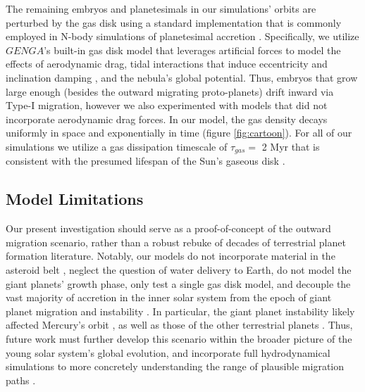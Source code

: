 \documentclass[trackchanges,twocolumn]{aastex}
\begin{document}
The remaining embryos and planetesimals in our simulations' orbits are perturbed by the gas disk using a standard implementation \citep{morishma10} that is commonly employed in N-body simulations of planetesimal accretion \citep[e.g.:][]{clement20_psj,woo21}.  Specifically, we utilize $GENGA$'s built-in gas disk model that leverages artificial forces to model the effects of aerodynamic drag, tidal interactions that induce eccentricity and inclination damping \citep{paardekooper11}, and the nebula's global potential.  Thus, embryos that grow large enough (besides the outward migrating proto-planets) drift inward via Type-I migration, however we also experimented with models that did not incorporate aerodynamic drag forces.  In our model, the gas density decays uniformly in space and exponentially in time (figure \ref{fig:cartoon}).  For all of our simulations we utilize a gas dissipation timescale of $\tau_{gas}=$ 2 Myr that is consistent with the presumed lifespan of the Sun's gaseous disk \citep[note that some observed gas disks are much older, see][and references therein]{hernandez07,morishma10,clement20_psj}.


\subsection{Model Limitations}
\label{sect:limits}

Our present investigation should serve as a proof-of-concept of the outward migration scenario, rather than a robust rebuke of decades of terrestrial planet formation literature.  Notably, our models do not incorporate material in the asteroid belt \citep[an important constraint for terrestrial planet formation models:][]{walsh11,ray17sci}, neglect the question of water delivery to Earth, do not model the giant planets' growth phase, only test a single gas disk model, and decouple the vast majority of accretion in the inner solar system from the epoch of giant planet migration and instability \citep{clement18}.  In particular, the giant planet instability likely affected Mercury's orbit \citep{bras13}, as well as those of the other terrestrial planets \citep{bras13,clement18}.  Thus, future work must further develop this scenario within the broader picture of the young solar system's global evolution, and incorporate full hydrodynamical simulations to more concretely understanding the range of plausible migration paths \citep[e.g.:][]{broz21}.  
\end{document}
